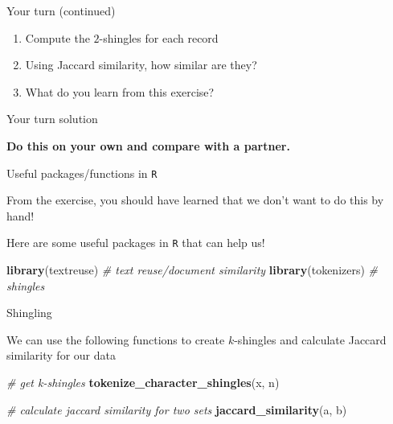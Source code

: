 \documentclass[
  ignorenonframetext,
]{beamer}
\newenvironment{Shaded}{\begin{snugshade}}{\end{snugshade}}
\newcommand{\CommentTok}[1]{\textcolor[rgb]{0.56,0.35,0.01}{\textit{#1}}}
\newcommand{\KeywordTok}[1]{\textcolor[rgb]{0.13,0.29,0.53}{\textbf{#1}}}
\newcommand{\NormalTok}[1]{#1}
\providecommand{\tightlist}{%
  \setlength{\itemsep}{0pt}\setlength{\parskip}{0pt}}
\begin{document}
\begin{frame}{Your turn (continued)}
\protect\hypertarget{your-turn-continued}{}

\begin{enumerate}
\tightlist
\item
  Compute the \(2\)-shingles for each record \vfill
\item
  Using Jaccard similarity, how similar are they? \vfill
\item
  What do you learn from this exercise?
\end{enumerate}

\end{frame}

\begin{frame}{Your turn solution}
\protect\hypertarget{your-turn-solution}{}

\textbf{Do this on your own and compare with a partner.}

\end{frame}

\begin{frame}[fragile]{Useful packages/functions in \texttt{R}}
\protect\hypertarget{useful-packagesfunctions-in-r}{}

From the exercise, you should have learned that we don't want to do this
by hand!

Here are some useful packages in \texttt{R} that can help us!

\vline

\begin{Shaded}
\begin{Highlighting}[]
\KeywordTok{library}\NormalTok{(textreuse) }\CommentTok{# text reuse/document similarity}
\KeywordTok{library}\NormalTok{(tokenizers) }\CommentTok{# shingles}
\end{Highlighting}
\end{Shaded}

\end{frame}

\begin{frame}[fragile]{Shingling}
\protect\hypertarget{shingling}{}

We can use the following functions to create \(k\)-shingles and
calculate Jaccard similarity for our data

\vline

\begin{Shaded}
\begin{Highlighting}[]
\CommentTok{# get k-shingles}
\KeywordTok{tokenize_character_shingles}\NormalTok{(x, n)}

\CommentTok{# calculate jaccard similarity for two sets}
\KeywordTok{jaccard_similarity}\NormalTok{(a, b) }
\end{Highlighting}
\end{Shaded}

\end{frame}
\end{document}
